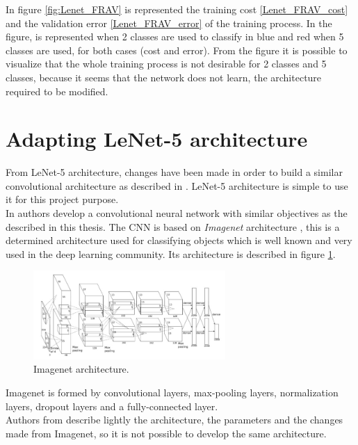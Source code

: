 In figure \ref{fig:Lenet_FRAV} is represented the training cost \ref{Lenet_FRAV_cost} and the validation error \ref{Lenet_FRAV_error} of the training process. In the figure, is represented when 2 classes are used to classify in  blue and red when 5 classes are used, for both cases (cost and error). From the figure it is possible to visualize that the whole training process is not desirable for 2 classes and 5 classes, because it seems that the network does not learn, the architecture required to be modified.\\

\section{Adapting LeNet-5 architecture}
From LeNet-5 architecture, changes have been made in order to build a similar convolutional architecture as described in \cite{yangLL14}. LeNet-5 architecture is simple to use it for this project purpose.\\

In \cite{yangLL14} authors develop a convolutional neural network with similar objectives as the described in this thesis. The CNN is based on \textit{Imagenet} architecture \cite{imagenet}, this is a determined architecture used for classifying objects which is well known and very used in the deep learning community. Its architecture is described in figure \ref{fig:Imagenet_architecture}.\\

\begin{figure}[htb]
\centering
\includegraphics[width=0.65\textwidth]{images_miscelaneus/Imagenet.png}
\caption{Imagenet architecture.} \label{fig:Imagenet_architecture}
\end{figure}

Imagenet is formed by convolutional layers, max-pooling layers, normalization layers, dropout layers and a fully-connected layer.\\

Authors from \cite{yangLL14} describe lightly the architecture, the parameters and the changes made from Imagenet, so it is not possible to develop the same architecture.\\

